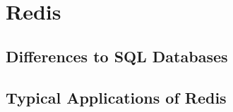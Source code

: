\newpage
\section{Redis}


\subsection{Differences to SQL Databases}

\subsection{Typical Applications of Redis}